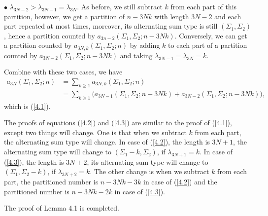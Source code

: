\documentclass[draft]{amsart}
\numberwithin{equation}{section}
\theoremstyle{plain}
\theoremstyle{remark}
\begin{document}
$\bullet$ $\lambda_{3N-2}> \lambda_{3N-1}=\lambda_{3N}.$   As before, we  still subtract $k$ from each part of this partition, however, we get a partition of $n-3Nk$ with length $3N-2$ and each part repeated at most times, moreover, its alternating sum type is still $(\Sigma_{1},\Sigma_{2})$, hence  a partition counted by $a_{3n-2}(\Sigma_{1},\Sigma_{2}; n-3Nk)$. Conversely, we can get a partition counted by 
$a_{3N,k}(\Sigma_{1},\Sigma_{2}; n)$ by adding $k$ to each part of a partition counted by $a_{3N-2}(\Sigma_{1},\Sigma_{2}; n-3Nk)$ and taking $\lambda_{3N-1}=\lambda_{3N}=k$. 

Combine with these two cases, we have
\begin{align*}
a_{3N}(\Sigma_{1},\Sigma_{2};n)
&=\sum_{k\geq 1}a_{3N,k}(\Sigma_{1}, \Sigma_{2};n)\\
&=\sum_{k\geq 1}\bigg( a_{3N-1}(\Sigma_{1},\Sigma_{2}; n-3Nk)   + a_{3N-2} (\Sigma_{1},\Sigma_{2};n-3Nk)           \bigg),
\end{align*}
which is (\ref{4.1}).

The proofs of equations (\ref{4.2}) and (\ref{4.3}) are similar to the proof of (\ref{4.1}), except two things will change. One is that when we subtract $k$ from each part, the alternating sum type will change. In case of (\ref{4.2}), the length is $3N+1$, the alternating sum type will change to $(\Sigma_{1}-k,\Sigma_{2})$, if $\lambda_{3N+1}=k$. In case of (\ref{4.3}), the length is $3N+2$, its alternating sum type will change to  $(\Sigma_{1},  \Sigma_{2}-k)$, if $\lambda_{3N+2}=k$. The other change is when we subtract $k$ from each part,  the partitioned number is  $n-3Nk-3k$ in case of (\ref{4.2}) and the partitioned number is $n-3Nk-2k$ in case of (\ref{4.3}).

The proof of Lemma 4.1 is completed.
\end{document}
